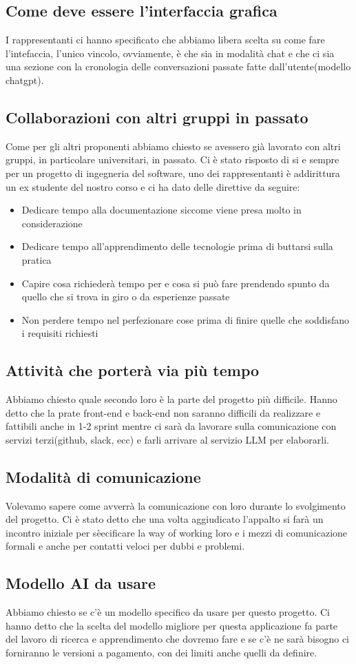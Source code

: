 \documentclass[italian, 12pt]{article}
\begin{document}
\subsection{Come deve essere l'interfaccia grafica}
I rappresentanti ci hanno specificato che abbiamo libera scelta su come fare l'intefaccia, l'unico vincolo, ovviamente, è che sia in modalità chat e che ci sia una sezione con la cronologia delle conversazioni passate fatte dall'utente(modello chatgpt).

\subsection{Collaborazioni con altri gruppi in passato}
Come per gli altri proponenti abbiamo chiesto se avessero già lavorato con altri gruppi, in particolare universitari, in passato. Ci è stato risposto di si e sempre per un progetto di ingegneria del software, uno dei rappresentanti è addirittura un ex studente del nostro corso e ci ha dato delle direttive da seguire:
\begin{itemize}
    \item Dedicare tempo alla documentazione siccome viene presa molto in considerazione
    \item Dedicare tempo all'apprendimento delle tecnologie prima di buttarsi sulla pratica
    \item Capire cosa richiederà tempo per e cosa si può fare prendendo spunto da quello che si trova in giro o da esperienze passate
    \item Non perdere tempo nel perfezionare cose prima di finire quelle che soddisfano i requisiti richiesti
\end{itemize}

\subsection{Attività che porterà via più tempo}
Abbiamo chiesto quale secondo loro è la parte del progetto più difficile. Hanno detto che la prate front-end e back-end non saranno difficili da realizzare e fattibili anche in 1-2 sprint mentre ci sarà da lavorare sulla comunicazione con servizi terzi(github, slack, ecc) e farli arrivare al servizio LLM per elaborarli.

\subsection{Modalità di comunicazione}
Volevamo sapere come avverrà la comunicazione con loro durante lo svolgimento del progetto. Ci è stato detto che una volta aggiudicato l'appalto si farà un incontro iniziale per sèecificare la way of working loro e i mezzi di comunicazione formali e anche per contatti veloci per dubbi e problemi.

\subsection{Modello AI da usare}
Abbiamo chiesto se c'è un modello specifico da usare per questo progetto. Ci hanno detto che la scelta del modello migliore per questa applicazione fa parte del lavoro di ricerca e apprendimento che dovremo fare e se c'è ne sarà bisogno ci forniranno le versioni a pagamento, con dei limiti anche quelli da definire.
\end{document}
